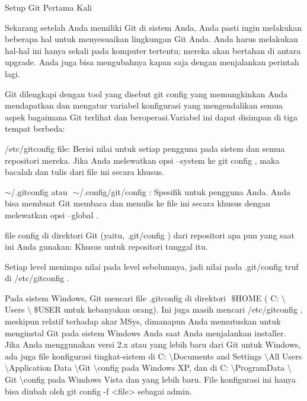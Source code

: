 \vspace{12pt}
\noindent 
Setup Git Pertama Kali \par
\vspace{12pt}
\noindent 
Sekarang setelah Anda memiliki Git di sistem Anda, Anda pasti ingin melakukan beberapa hal untuk menyesuaikan lingkungan Git Anda. $  $Anda harus melakukan hal-hal ini hanya sekali pada komputer tertentu; $  $mereka akan bertahan di antara upgrade. $  $Anda juga bisa mengubahnya kapan saja dengan menjalankan perintah lagi. \par
\vspace{12pt}
\noindent 
Git dilengkapi dengan tool yang disebut $  $git config $  $yang memungkinkan Anda mendapatkan dan mengatur variabel konfigurasi yang mengendalikan semua aspek bagaimana Git terlihat dan beroperasi.Variabel ini dapat disimpan di tiga tempat berbeda: \par
\vspace{12pt}
\noindent 
/etc/gitconfig $  $file: Berisi nilai untuk setiap pengguna pada sistem dan semua repositori mereka. $  $Jika Anda melewatkan opsi $  $--system $  $ke $  $git config $  $, maka bacalah dan tulis dari file ini secara khusus. \par
\vspace{12pt}
\noindent 
 $  \sim  $/.gitconfig $  $atau $  $ $  \sim  $/.config/git/config $  $: Spesifik untuk pengguna Anda. $  $Anda bisa membuat Git membaca dan menulis ke file ini secara khusus dengan melewatkan opsi $  $--global $  $. \par
\vspace{12pt}
\noindent 
file $  $config $  $di direktori Git (yaitu, $  $.git/config $  $) dari repositori apa pun yang saat ini Anda gunakan: Khusus untuk repositori tunggal itu. \par
\vspace{12pt}
\noindent 
Setiap level menimpa nilai pada level sebelumnya, jadi nilai pada $  $.git/config $  $truf di $  $/etc/gitconfig $  $. \par
\noindent 
Pada sistem Windows, Git mencari file $  $.gitconfig $  $di direktori $  $ $  \$  $HOME $  $( $  $C: $  \setminus  $Users $  \setminus  $ $  \$  $USER $  $untuk kebanyakan orang). $  $Ini juga masih mencari $  $/etc/gitconfig $  $, meskipun relatif terhadap akar MSys, dimanapun Anda memutuskan untuk menginstal Git pada sistem Windows Anda saat Anda menjalankan installer. $  $Jika Anda menggunakan versi 2.x atau yang lebih baru dari Git untuk Windows, ada juga file konfigurasi tingkat-sistem di $  $C: $  \setminus  $Documents and Settings $  \setminus  $All Users $  \setminus  $Application Data $  \setminus  $Git $  \setminus  $config $  $pada Windows XP, dan di $  $C: $  \setminus  $ProgramData $  \setminus  $Git $  \setminus  $config $  $pada Windows Vista dan yang lebih baru. $  $File konfigurasi ini hanya bisa diubah oleh $  $git config -f <file> $  $sebagai admin. \par
